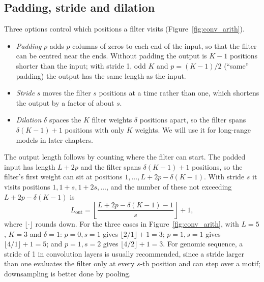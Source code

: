 \subsection{Padding, stride and dilation}

Three options control which positions a filter visits (Figure~\ref{fig:conv_arith}).
\begin{itemize}
  \item \emph{Padding} $p$ adds $p$ columns of zeros to each end of the input, so that the filter can be centred near the ends. Without padding the output is $K-1$ positions shorter than the input; with stride 1, odd $K$ and $p=(K-1)/2$ (``same'' padding) the output has the same length as the input.
  \item \emph{Stride} $s$ moves the filter $s$ positions at a time rather than one, which shortens the output by a factor of about $s$.
  \item \emph{Dilation} $\delta$ spaces the $K$ filter weights $\delta$ positions apart, so the filter spans $\delta(K-1)+1$ positions with only $K$ weights. We will use it for long-range models in later chapters.
\end{itemize}
The output length follows by counting where the filter can start. The padded input has length $L+2p$ and the filter spans $\delta(K-1)+1$ positions, so the filter's first weight can sit at positions $1,\dots,L+2p-\delta(K-1)$. With stride $s$ it visits positions $1,1+s,1+2s,\dots$, and the number of these not exceeding $L+2p-\delta(K-1)$ is
\begin{equation}
  L_{\text{out}} = \left\lfloor\frac{L+2p-\delta(K-1)-1}{s}\right\rfloor + 1,
  \label{eq:lout}
\end{equation}
where $\lfloor\cdot\rfloor$ rounds down. For the three cases in Figure~\ref{fig:conv_arith}, with $L=5$, $K=3$ and $\delta=1$: $p=0,s=1$ gives $\lfloor 2/1\rfloor+1=3$; $p=1,s=1$ gives $\lfloor4/1\rfloor+1=5$; and $p=1,s=2$ gives $\lfloor4/2\rfloor+1=3$. For genomic sequence, a stride of 1 in convolution layers is usually recommended, since a stride larger than one evaluates the filter only at every $s$-th position and can step over a motif; downsampling is better done by pooling.

